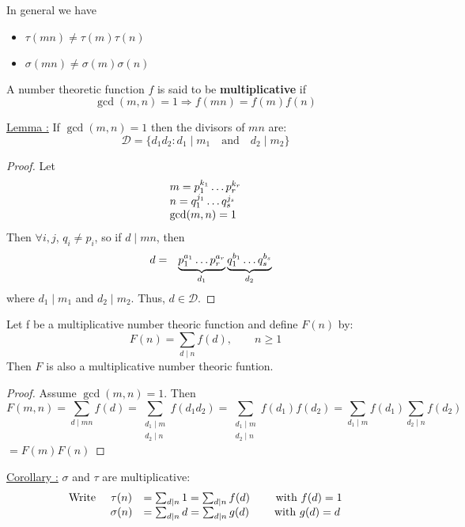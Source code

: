 \documentclass{report}
\begin{document}
In general we have 
	\begin{itemize}
		\item $\tau(mn) \neq \tau(m) \tau(n)$
		\item $\sigma(mn) \neq \sigma(m) \sigma(n)$
	\end{itemize}
\begin{defi}
	A number theoretic function $f$ is said to be \textbf{multiplicative} if
		\[\gcd(m,n)=1 \Rightarrow f(mn)=f(m)f(n) \]
\end{defi}
\underline{Lemma :} If $\gcd(m,n)=1$ then the divisors of $mn$ are:
	\[\mathcal{D} = \{d_1 d_2 : d_1 \mid m_1 \quad \text{and}\quad d_2 \mid m_2 \} \]
\begin{proof}
	Let
	\[
	\begin{array}{l c l}
		m=p_1^{k_1} \dots p_r^{k_r}\\
		n=q_1^{j_1} \dots q_s^{j_s}\\
		\gcd(m,n)=1\\
	\end{array}
	\]
	Then $\forall i,j$, $q_i \neq p_i$, so if $d\mid mn$, then
		\[
			\begin{array}{l l l}
				&d=&\underbrace{p_1^{a_1} \dots p_r^{a_r}}_{d_1} \underbrace{q_1^{b_1} \dots q_s^{b_s}}_{d_2}
			\end{array}
		\]
	where $d_1\mid m_1$ and $d_2\mid m_2$. Thus, $d\in \mathcal{D}$.
\end{proof}
\begin{thm} Let f be a multiplicative number theoric function and define $F(n)$ by:
			\[F(n)= \sum_{d\mid n} f(d), \qquad n \geq 1 \]
			Then $F$ is also a multiplicative number theoric funtion.
\end{thm}
\begin{proof}
	Assume $\gcd(m,n)=1$. Then
		\[ F(m,n)=\sum_{d \mid mn} f(d) = 
		\sum_{\substack{d_1 \mid m\\ d_2 \mid n}} f(d_1d_2)= \sum_{\substack{d_1 \mid m\\ d_2 \mid n}} f(d_1)f(d_2)=\sum_{d_1 \mid m} f(d_1) \sum_{d_2 \mid n} f(d_2)
		\]
	$=F(m)F(n)$
\end{proof}
\underline{Corollary :} $\sigma$ and $\tau$ are multiplicative:\\
		\[
			\begin{array}{r c l}
				\text{Write }&\tau(n)& =\sum_{d\mid n} 1 = \sum_{d \mid n} f(d) \qquad \text{ with }f(d)=1\\
				&\sigma(n)&= \sum_{d \mid n} d = \sum_{d\mid n} g(d) \qquad \; \text{with } g(d)=d\\
			\end{array}
		\]
\newpage 
		
\end{document}
